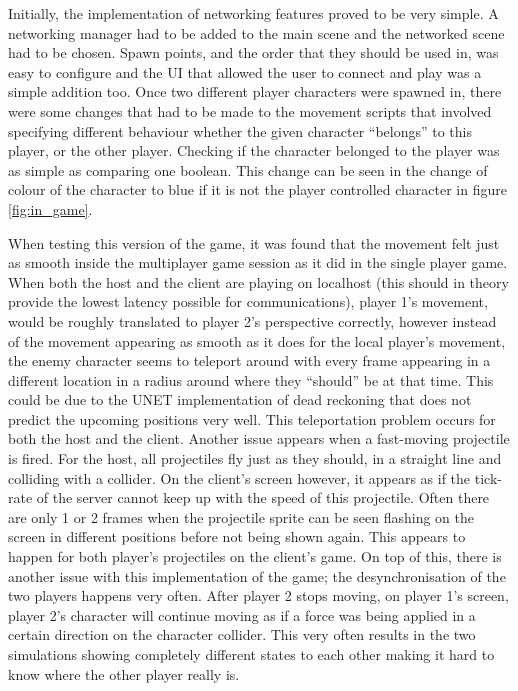 Initially, the implementation of networking features proved to be very simple. A networking manager had to be added to the main scene and the networked scene had to be chosen. Spawn points, and the order that they should be used in, was easy to configure and the UI that allowed the user to connect and play was a simple addition too. Once two different player characters were spawned in, there were some changes that had to be made to the movement scripts that involved specifying different behaviour whether the given character ``belongs'' to this player, or the other player. Checking if the character belonged to the player was as simple as comparing one boolean. This change can be seen in the change of colour of the character to blue if it is not the player controlled character in figure \ref{fig:in_game}.

When testing this version of the game, it was found that the movement felt just as smooth inside the multiplayer game session as it did in the single player game. When both the host and the client are playing on localhost (this should in theory provide the lowest latency possible for communications), player 1's movement, would be roughly translated to player 2's perspective correctly, however instead of the movement appearing as smooth as it does for the local player's movement, the enemy character seems to teleport around with every frame appearing in a different location in a radius around where they ``should'' be at that time. This could be due to the UNET implementation of dead reckoning that does not predict the upcoming positions very well. This teleportation problem occurs for both the host and the client. Another issue appears when a fast-moving projectile is fired. For the host, all projectiles fly just as they should, in a straight line and colliding with a collider. On the client's screen however, it appears as if the tick-rate of the server cannot keep up with the speed of this projectile. Often there are only 1 or 2 frames when the projectile sprite can be seen flashing on the screen in different positions before not being shown again. This appears to happen for both player's projectiles on the client's game. On top of this, there is another issue with this implementation of the game; the desynchronisation of the two players happens very often. After player 2 stops moving, on player 1's screen, player 2's character will continue moving as if a force was being applied in a certain direction on the character collider. This very often results in the two simulations showing completely different states to each other making it hard to know where the other player really is.

